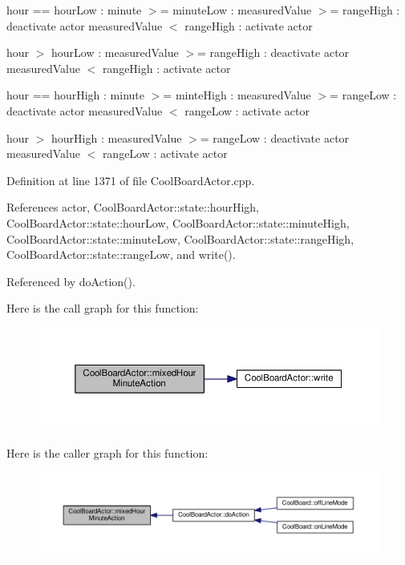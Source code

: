 hour == hour\+Low \+: minute $>$= minute\+Low \+: measured\+Value $>$= range\+High \+: deactivate actor measured\+Value $<$ range\+High \+: activate actor

hour $>$ hour\+Low \+: measured\+Value $>$= range\+High \+: deactivate actor measured\+Value $<$ range\+High \+: activate actor

hour == hour\+High \+: minute $>$= minte\+High \+: measured\+Value $>$= range\+Low \+: deactivate actor measured\+Value $<$ range\+Low \+: activate actor

hour $>$ hour\+High \+: measured\+Value $>$= range\+Low \+: deactivate actor measured\+Value $<$ range\+Low \+: activate actor 

Definition at line 1371 of file Cool\+Board\+Actor.\+cpp.



References actor, Cool\+Board\+Actor\+::state\+::hour\+High, Cool\+Board\+Actor\+::state\+::hour\+Low, Cool\+Board\+Actor\+::state\+::minute\+High, Cool\+Board\+Actor\+::state\+::minute\+Low, Cool\+Board\+Actor\+::state\+::range\+High, Cool\+Board\+Actor\+::state\+::range\+Low, and write().



Referenced by do\+Action().

Here is the call graph for this function\+:
\nopagebreak
\begin{figure}[H]
\begin{center}
\leavevmode
\includegraphics[width=350pt]{dc/d69/class_cool_board_actor_ae6b2a17b0e73cfeb353ded2cc4e08109_cgraph}
\end{center}
\end{figure}
Here is the caller graph for this function\+:
\nopagebreak
\begin{figure}[H]
\begin{center}
\leavevmode
\includegraphics[width=350pt]{dc/d69/class_cool_board_actor_ae6b2a17b0e73cfeb353ded2cc4e08109_icgraph}
\end{center}
\end{figure}
\mbox{\label{class_cool_board_actor_a5af5538fc7d169f63127e06d5219bcd4}} 
